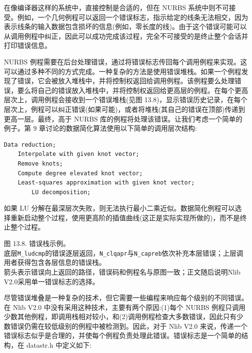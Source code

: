 \documentclass[../main.tex]{subfiles}
\begin{document}
在像编译器这样的系统中，直接控制是合适的，但在 NURBS 系统中则不可接受。例如，一个几何例程可以返回一个错误标志，指示给定的线条无法相交，因为表示线条的输入数据包含损坏的信息(例如，零长度的线)。由于这个错误可能可以从调用例程中纠正，因此可以成功完成该过程，完全不可接受的是终止整个会话并打印错误信息。

NURBS 例程需要在后台处理错误，通过将错误标志传回每个调用例程来实现。这可以通过多种不同的方式完成。一种复杂的方法是使用错误堆栈。如果一个例程发现了错误，它会被放入堆栈中，并将控制权返回给调用例程。该例程要么处理错误，要么将自己的错误放入堆栈中，并将控制权返回给更高层的例程。在每个更高层次上，调用例程会接收到一个错误堆栈(见图 13.8)，显示错误历史记录，在每个层次上，例程可以纠正错误(如果可能)，或者将堆栈(其自己的错误在顶部)传递到更高一层。最终，高于 NURBS 库的例程将处理该错误。让我们考虑一个简单的例子。第 9 章讨论的数据简化算法使用以下简单的调用层次结构:

\begin{verbatim}
Data reduction;
    Interpolate with given knot vector;
    Remove knots;
    Compute degree elevated knot vector;
    Least-squares approximation with given knot vector;
        LU decomposition;
\end{verbatim}

如果 LU 分解在最深层次失败，则无法执行最小二乘近似。数据简化例程可以选择重新启动整个过程，使用更高阶的插值曲线(这正是实际实现所做的)，而不是终止整个过程。



\begin{center}
\begin{minipage}{26cm}
\centering
{}
\par\smallskip
图 13.8. 错误栈示例。\\
底层\texttt{M\_ludcmp}的错误逐层返回，\texttt{N\_clqapr}与\texttt{N\_capreb}依次补充本层错误；上层调用者获得包含各层信息的错误栈。\\
箭头表示错误向上返回的路径，错误码和例程名与原图一致；正文随后说明Nlib V2.0采用单一错误标志的选择。
\end{minipage}
\end{center}

尽管错误堆叠是一种复杂的技术，但它需要一些编程来响应每个级别的不同错误。在 Nlib V2.0 中没有采用这种技术，主要有两个原因:(1)每个 NURBS 例程只调用少数其他例程，即调用栈相对较小，和(2)调用例程检查大多数错误，因此只有少数错误仍需在较低级别的例程中被检测到。因此，对于 Nlib V2.0 来说，传递一个错误标志似乎是合理的，并使每个例程负责处理此错误。错误标志是一个简单的结构，在 datastr.h 中定义如下:
\end{document}
